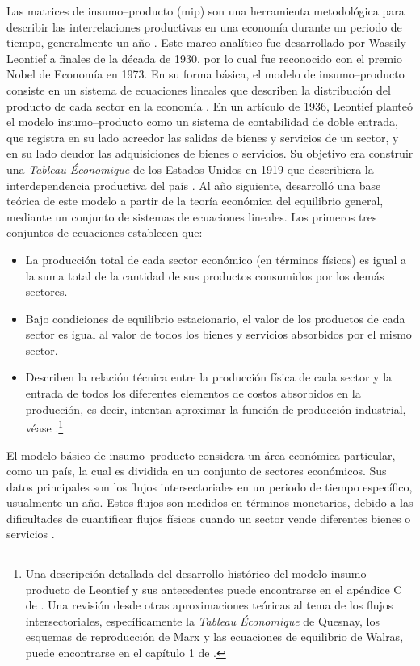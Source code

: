 Las matrices de insumo--producto (\acrshort{mip}) son una herramienta metodológica para describir las interrelaciones productivas en una economía durante un periodo de tiempo, generalmente un año \parencite[p.~13]{Durán2021}. Este marco analítico fue desarrollado por Wassily Leontief a finales de la década de 1930, por lo cual fue reconocido con el premio Nobel de Economía en 1973. En su forma básica, el modelo de insumo--producto consiste en un sistema de ecuaciones lineales que describen la distribución del producto de cada sector en la economía \parencite[p.~1]{Miller2012}. En un artículo de 1936, Leontief planteó el modelo insumo--producto como un sistema de contabilidad de doble entrada, que registra en su lado acreedor las salidas de bienes y servicios de un sector, y en su lado deudor las adquisiciones de bienes o servicios. Su objetivo era construir una \textit{Tableau Économique} de los Estados Unidos en 1919 que describiera la interdependencia productiva del país \parencite[p.~105]{Leontief1936}. Al año siguiente, desarrolló una base teórica de este modelo a partir de la teoría económica del equilibrio general, mediante un conjunto de sistemas de ecuaciones lineales. Los primeros tres conjuntos de ecuaciones establecen que:
\begin{itemize}
 \item La producción total de cada sector económico (en términos físicos) es igual a la suma total de la cantidad de sus productos consumidos por los demás sectores.
 \item Bajo condiciones de equilibrio estacionario, el valor de los productos de cada sector es igual al valor de todos los bienes y servicios absorbidos por el mismo sector.
 \item Describen la relación técnica entre la producción física de cada sector y la entrada de todos los diferentes elementos de costos absorbidos en la producción, es decir, intentan aproximar la función de producción industrial, véase \textcite{Leontief1937}.\footnote{Una descripción detallada del desarrollo histórico del modelo insumo--producto de Leontief y sus antecedentes puede encontrarse en el apéndice C de \textcite{Miller2012}. Una revisión desde otras aproximaciones teóricas al tema de los flujos intersectoriales, específicamente la \textit{Tableau Économique} de Quesnay, los esquemas de reproducción de Marx y las ecuaciones de equilibrio de Walras, puede encontrarse en el capítulo 1 de \textcite{Mariña1993}.}
\end{itemize}

El modelo básico de insumo--producto considera un área económica particular, como un país, la cual es dividida en un conjunto de sectores económicos. Sus datos principales son los flujos intersectoriales en un periodo de tiempo específico, usualmente un año. Estos flujos son medidos en términos monetarios, debido a las dificultades de cuantificar flujos físicos cuando un sector vende diferentes bienes o servicios \parencite[pp.~10--11]{Miller2012}.

